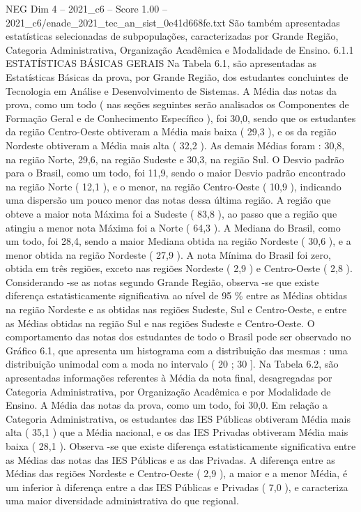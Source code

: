 \begin{textsample}{NEG Dim 4 – 2021\_c6 – Score 1.00 – 2021\_c6/enade\_2021\_tec\_an\_sist\_0e41d668fe.txt}
São também apresentadas estatísticas selecionadas de subpopulações, caracterizadas por Grande Região, Categoria Administrativa, Organização Acadêmica e Modalidade de Ensino. 6.1.1 ESTATÍSTICAS BÁSICAS GERAIS Na Tabela 6.1, são apresentadas as Estatísticas Básicas da prova, por Grande Região, dos estudantes concluintes de Tecnologia em Análise e Desenvolvimento de Sistemas.
A Média das notas da prova, como um todo ( nas seções seguintes serão analisados os Componentes de Formação Geral e de Conhecimento Específico ), foi 30,0, sendo que os estudantes da região Centro-Oeste obtiveram a Média mais baixa ( 29,3 ), e os da região Nordeste obtiveram a Média mais alta ( 32,2 ).
As demais Médias foram : 30,8, na região Norte, 29,6, na região Sudeste e 30,3, na região Sul.
O Desvio padrão para o Brasil, como um todo, foi 11,9, sendo o maior Desvio padrão encontrado na região Norte ( 12,1 ), e o menor, na região Centro-Oeste ( 10,9 ), indicando uma dispersão um pouco menor das notas dessa última região.
A região que obteve a maior nota Máxima foi a Sudeste ( 83,8 ), ao passo que a região que atingiu a menor nota Máxima foi a Norte ( 64,3 ).
A Mediana do Brasil, como um todo, foi 28,4, sendo a maior Mediana obtida na região Nordeste ( 30,6 ), e a menor obtida na região Nordeste ( 27,9 ).
A nota Mínima do Brasil foi zero, obtida em três regiões, exceto nas regiões Nordeste ( 2,9 ) e Centro-Oeste ( 2,8 ).
Considerando -se as notas segundo Grande Região, observa -se que existe diferença estatisticamente significativa ao nível de 95 \% entre as Médias obtidas na região Nordeste e as obtidas nas regiões Sudeste, Sul e Centro-Oeste, e entre as Médias obtidas na região Sul e nas regiões Sudeste e Centro-Oeste.
O comportamento das notas dos estudantes de todo o Brasil pode ser observado no Gráfico 6.1, que apresenta um histograma com a distribuição das mesmas : uma distribuição unimodal com a moda no intervalo ( 20 ; 30 ].
Na Tabela 6.2, são apresentadas informações referentes à Média da nota final, desagregadas por Categoria Administrativa, por Organização Acadêmica e por Modalidade de Ensino.
A Média das notas da prova, como um todo, foi 30,0.
Em relação a Categoria Administrativa, os estudantes das IES Públicas obtiveram Média mais alta ( 35,1 ) que a Média nacional, e os das IES Privadas obtiveram Média mais baixa ( 28,1 ).
Observa -se que existe diferença estatisticamente significativa entre as Médias das notas das IES Públicas e as das Privadas.
A diferença entre as Médias das regiões Nordeste e Centro-Oeste ( 2,9 ), a maior e a menor Média, é um inferior à diferença entre a das IES Públicas e Privadas ( 7,0 ), e caracteriza uma maior diversidade administrativa do que regional.

\end{textsample}
